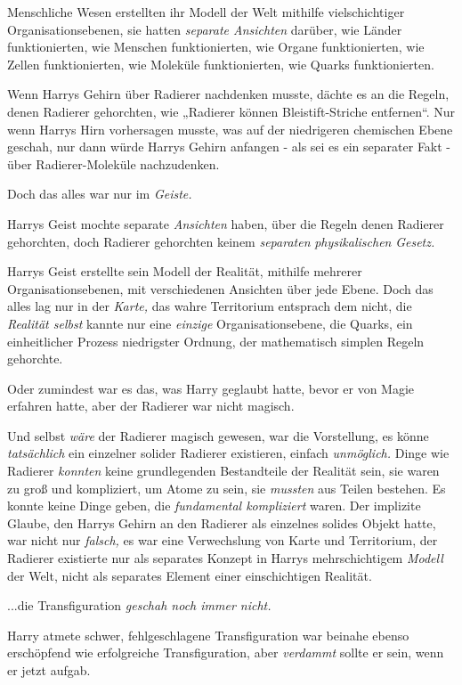 {Menschliche Wesen erstellten ihr Modell der Welt mithilfe vielschichtiger Organisationsebenen, sie hatten \emph{separate Ansichten} darüber, wie Länder funktionierten, wie Menschen funktionierten, wie Organe funktionierten, wie Zellen funktionierten, wie Moleküle funktionierten, wie Quarks funktionierten.

Wenn Harrys Gehirn über Radierer nachdenken musste, dächte es an die Regeln, denen Radierer gehorchten, wie „Radierer können Bleistift-Striche entfernen“. Nur wenn Harrys Hirn vorhersagen musste, was auf der niedrigeren chemischen Ebene geschah, nur dann würde Harrys Gehirn anfangen - als sei es ein separater Fakt - über Radierer-Moleküle nachzudenken.

Doch das alles war nur im \emph{Geiste.}

Harrys Geist mochte separate \emph{Ansichten} haben, über die Regeln denen Radierer gehorchten, doch Radierer gehorchten keinem \emph{separaten} \emph{physikalischen} \emph{Gesetz.}

Harrys Geist erstellte sein Modell der Realität, mithilfe mehrerer Organisationsebenen, mit verschiedenen Ansichten über jede Ebene. Doch das alles lag nur in der \emph{Karte,} das wahre Territorium entsprach dem nicht, die \emph{Realität selbst} kannte nur eine \emph{einzige} Organisationsebene, die Quarks, ein einheitlicher Prozess niedrigster Ordnung, der mathematisch simplen Regeln gehorchte.

Oder zumindest war es das, was Harry geglaubt hatte, bevor er von Magie erfahren hatte, aber der Radierer war nicht magisch.

Und selbst \emph{wäre} der Radierer magisch gewesen, war die Vorstellung, es könne \emph{tatsächlich} ein einzelner solider Radierer existieren, einfach \emph{unmöglich.} Dinge wie Radierer \emph{konnten} keine grundlegenden Bestandteile der Realität sein, sie waren zu groß und kompliziert, um Atome zu sein, sie \emph{mussten} aus Teilen bestehen. Es konnte keine Dinge geben, die \emph{fundamental kompliziert} waren. Der implizite Glaube, den Harrys Gehirn an den Radierer als einzelnes solides Objekt hatte, war nicht nur \emph{falsch,} es war eine Verwechslung von Karte und Territorium, der Radierer existierte nur als separates Konzept in Harrys mehrschichtigem \emph{Modell} der Welt, nicht als separates Element einer einschichtigen Realität.

...die Transfiguration \emph{geschah noch immer nicht.}

Harry atmete schwer, fehlgeschlagene Transfiguration war beinahe ebenso erschöpfend wie erfolgreiche Transfiguration, aber \emph{verdammt} sollte er sein, wenn er jetzt aufgab.

}
